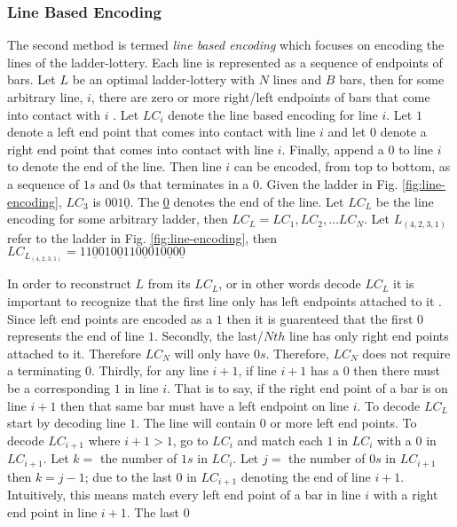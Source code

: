 \subsubsection{Line Based Encoding}
The second method is termed \emph{line based encoding} which focuses 
on encoding the lines of the ladder-lottery. Each line is represented 
as a sequence of endpoints of bars. Let $L$ be an optimal ladder-lottery 
with $N$ lines and $B$ bars, then for some arbitrary line, $i$, there 
are zero or more right/left endpoints of bars that 
come into contact with $i$ \cite{A5}. Let $LC_{i}$ denote the line based encoding for line $i$.
Let $1$ denote a left end point that 
comes into contact with line $i$ and let $0$ denote a right 
end point that comes into contact with line $i$. Finally, append a $0$
to line $i$ to denote the end of the line. Then line $i$ can be 
encoded, from top to bottom, as a sequence of $1s$ and $0s$ that 
terminates in a $0$.  Given the ladder in Fig. \ref{fig:line-encoding}, 
$LC_{3}$ is $001\underline{0}$. The \underline{0} denotes 
the end of the line. Let $LC_{L}$ be the line encoding for 
some arbitrary ladder, then $LC_{L}=LC_{1}, LC_{2}, \dots LC_{N}$.
Let $L_{(4,2,3,1)}$ refer to the ladder in Fig. \ref{fig:line-encoding}, then 
$LC_{L_{(4,2,3,1)}}=11\underline{0}010\underline{0}110\underline{0}010\underline{0}0\underline{0}$\par 
In order to reconstruct $L$ from its $LC_{L}$, or in other words decode
$LC_{L}$ it is important to recognize that the first line only has left endpoints attached to it
\cite{A5}. Since left end points are encoded as a $1$ then it is guarenteed that the first $0$ 
represents the end of line $1$. Secondly, the last/$Nth$ line 
has only right end points attached to it.  Therefore $LC_{N}$ will only have $0s$. Therefore, $LC_{N}$
does not require a terminating $0$. Thirdly, for any 
line $i+1$, if line $i+1$ has a $0$ then there must be a corresponding $1$
in line $i$. That is to say, if the right end point of a bar is on line 
$i+1$ then that same bar must have a left endpoint on line $i$. To decode 
$LC_{L}$ start by decoding line $1$. The line will contain $0$ or more 
left end points. To decode $LC_{i+1}$ where $i+1>1$, go to 
$LC_{i}$ and match each $1$ in $LC_{i}$ with a $0$ in $LC_{i+1}$. 
Let $k=$ the number of $1s$ in $LC_{i}$. Let $j=$ the number 
of $0s$ in $LC_{i+1}$ then $k=j-1$; due to the last $0$ in $LC_{i+1}$ denoting 
the end of line $i+1$.  Intuitively, this means match every left end point 
of a bar in line $i$ with a right end point in line $i+1$. The last $0$
